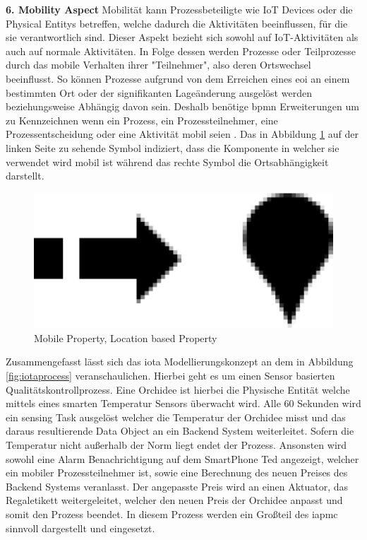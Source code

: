\documentclass[a4paper, 12pt, twoside, headsepline=true]{scrartcl} %
\begin{document}
\textbf{6. Mobility Aspect}
\newline
Mobilität kann Prozessbeteiligte wie IoT Devices oder die Physical Entitys betreffen, welche dadurch die Aktivitäten beeinflussen, für die sie verantwortlich sind. Dieser Aspekt bezieht sich sowohl auf IoT-Aktivitäten als auch auf normale Aktivitäten. In Folge dessen werden Prozesse oder Teilprozesse durch das mobile Verhalten ihrer "Teilnehmer", also deren Ortswechsel beeinflusst. So können Prozesse aufgrund von dem Erreichen eines \ac{eoi} an einem bestimmten Ort oder der signifikanten Lageänderung ausgelöst werden beziehungsweise Abhängig davon sein. Deshalb benötige \ac{bpmn} Erweiterungen um zu Kennzeichnen wenn ein Prozess, ein Prozessteilnehmer, eine Prozessentscheidung oder eine Aktivität mobil seien \cite[S.68-70]{conceptsiotawarepm}. Das in Abbildung \ref{fig:mobile} auf der linken Seite zu sehende Symbol indiziert, dass die Komponente in welcher sie verwendet wird mobil ist während das rechte Symbol die Ortsabhängigkeit darstellt.

\begin{figure}[H]
	\includegraphics[height=0.75 cm,keepaspectratio,center]{figures/Mobile}
	\caption{Mobile Property, Location based Property\cite[S.71]{conceptsiotawarepm}}
	\label{fig:mobile}
\end{figure} 

Zusammengefasst lässt sich das \ac{iota} Modellierungskonzept an dem in Abbildung \ref{fig:iotaprocess} veranschaulichen. Hierbei geht es um einen Sensor basierten Qualitätskontrollprozess. Eine Orchidee ist hierbei die Physische Entität welche mittels eines smarten Temperatur Sensors überwacht wird. Alle 60 Sekunden wird ein sensing Task ausgelöst welcher die Temperatur der Orchidee misst und das daraus resultierende Data Object an ein Backend System weiterleitet. Sofern die Temperatur nicht außerhalb der Norm liegt endet der Prozess. Ansonsten wird sowohl eine Alarm Benachrichtigung auf dem SmartPhone Ted angezeigt, welcher ein mobiler Prozessteilnehmer ist, sowie eine Berechnung des neuen Preises des Backend Systems veranlasst. Der angepasste Preis wird an einen Aktuator, das Regaletikett weitergeleitet, welcher den neuen Preis der Orchidee anpasst und somit den Prozess beendet. In diesem Prozess werden ein Großteil des \ac{iapmc} sinnvoll dargestellt und eingesetzt.
\end{document}
